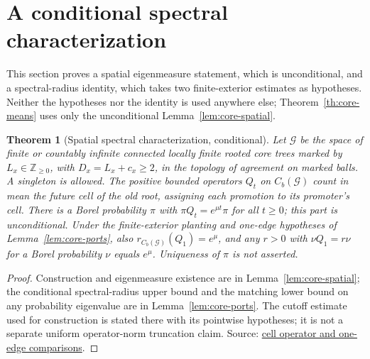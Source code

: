 \documentclass[11pt]{article}
\newcommand{\proofsrc}[2]{\href{https://github.com/uzay-eth/friend-tree-exponent/blob/a0972085ad72ad5685ae7b424988648d1965e73c/#1}{#2}}
\newtheorem{theorem}{Theorem}
\newcommand{\resulttag}{?}
\newcommand{\tagnext}[1]{\renewcommand{\resulttag}{#1}}
\theoremstyle{remark}
\numberwithin{equation}{section}
\begin{document}
\section{A conditional spectral characterization}\label{sec:spa}
This section proves a spatial eigenmeasure statement, which is unconditional, and a spectral-radius identity, which takes two finite-exterior estimates as hypotheses. Neither the hypotheses nor the identity is used anywhere else; Theorem~\ref{th:core-means} uses only the unconditional Lemma~\ref{lem:core-spatial}.
\tagnext{SPA}
\begin{theorem}[Spatial spectral characterization, conditional]\label{th:core-spatial}
Let $\mathcal G$ be the space of finite or countably infinite connected locally finite rooted core trees marked by $L_x\in\mathbb Z_{\ge0}$, with $D_x=L_x+c_x\ge2$, in the topology of agreement on marked balls. A singleton is allowed. The positive bounded operators $Q_t$ on $C_b(\mathcal G)$ count in mean the future cell of the old root, assigning each promotion to its promoter's cell. There is a Borel probability $\pi$ with $\pi Q_t=e^{\mu t}\pi$ for all $t\ge0$; this part is unconditional. Under the finite-exterior planting and one-edge hypotheses of Lemma~\ref{lem:core-ports}, also $r_{C_b(\mathcal G)}(Q_1)=e^\mu$, and any $r>0$ with $\nu Q_1=r\nu$ for a Borel probability $\nu$ equals $e^\mu$. Uniqueness of $\pi$ is not asserted.
\end{theorem}
\begin{proof}
Construction and eigenmeasure existence are in Lemma~\ref{lem:core-spatial}; the conditional spectral-radius upper bound and the matching lower bound on any probability eigenvalue are in Lemma~\ref{lem:core-ports}. The cutoff estimate used for construction is stated there with its pointwise hypotheses; it is not a separate uniform operator-norm truncation claim. Source: \proofsrc{round2/proofs/astra/source/round2/operator.md}{cell operator and one-edge comparisons}.
\end{proof}
\end{document}
